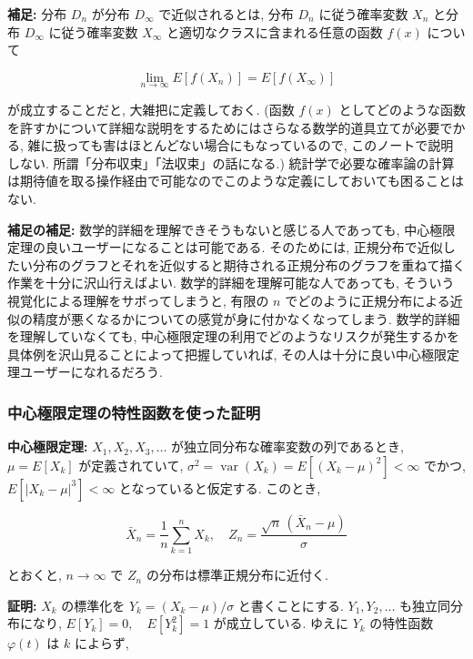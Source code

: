 \documentclass[
  letterpaper,
  DIV=11,
  numbers=noendperiod]{scrartcl}
\begin{document}
\textbf{補足:} 分布 \(D_n\) が分布 \(D_\infty\) で近似されるとは, 分布
\(D_n\) に従う確率変数 \(X_n\) と分布 \(D_\infty\) に従う確率変数
\(X_\infty\) と適切なクラスに含まれる任意の函数 \(f(x)\) について

\[
\lim_{n\to\infty} E[f(X_n)] = E[f(X_\infty)]
\]

が成立することだと, 大雑把に定義しておく. (函数 \(f(x)\)
としてどのような函数を許すかについて詳細な説明をするためにはさらなる数学的道具立てが必要でかる,
雑に扱っても害はほとんどない場合にもなっているので,
このノートで説明しない. 所謂「分布収束」「法収束」の話になる.)
統計学で必要な確率論の計算は期待値を取る操作経由で可能なのでこのような定義にしておいても困ることはない.

\textbf{補足の補足:} 数学的詳細を理解できそうもないと感じる人であっても,
中心極限定理の良いユーザーになることは可能である. そのためには,
正規分布で近似したい分布のグラフとそれを近似すると期待される正規分布のグラフを重ねて描く作業を十分に沢山行えばよい.
数学的詳細を理解可能な人であっても,
そういう視覚化による理解をサボってしまうと, 有限の \(n\)
でどのように正規分布による近似の精度が悪くなるかについての感覚が身に付かなくなってしまう.
数学的詳細を理解していなくても,
中心極限定理の利用でどのようなリスクが発生するかを具体例を沢山見ることによって把握していれば,
その人は十分に良い中心極限定理ユーザーになれるだろう.

\hypertarget{ux4e2dux5fc3ux6975ux9650ux5b9aux7406ux306eux7279ux6027ux51fdux6570ux3092ux4f7fux3063ux305fux8a3cux660e}{%
\subsubsection{中心極限定理の特性函数を使った証明}\label{ux4e2dux5fc3ux6975ux9650ux5b9aux7406ux306eux7279ux6027ux51fdux6570ux3092ux4f7fux3063ux305fux8a3cux660e}}

\textbf{中心極限定理:} \(X_1, X_2, X_3, \ldots\)
が独立同分布な確率変数の列であるとき, \(\mu=E[X_k]\) が定義されていて,
\(\sigma^2 = \operatorname{var}(X_k) = E[(X_k - \mu)^2] < \infty\)
でかつ, \(E[|X_k - \mu|^3] < \infty\) となっていると仮定する. このとき,

\[
\bar{X}_n = \frac{1}{n}\sum_{k=1}^n X_k, \quad
Z_n = \frac{\sqrt{n}\,(\bar{X}_n - \mu)}{\sigma}
\]

とおくと, \(n\to\infty\) で \(Z_n\) の分布は標準正規分布に近付く.

\textbf{証明:} \(X_k\) の標準化を \(Y_k = (X_k - \mu)/\sigma\)
と書くことにする. \(Y_1, Y_2, \ldots\) も独立同分布になり,
\(E[Y_k] = 0, \quad E[Y_k^2] = 1\) が成立している. ゆえに \(Y_k\)
の特性函数 \(\varphi(t)\) は \(k\) によらず,
\end{document}

